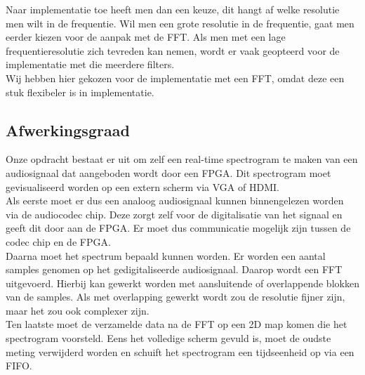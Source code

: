 \documentclass[a4paper,kul]{kulakarticle} %
\begin{document}
Naar implementatie toe heeft men dan een keuze, dit hangt af welke resolutie men wilt in de frequentie. Wil men een grote resolutie in de frequentie, gaat men eerder kiezen voor de aanpak met de FFT. Als men met een lage frequentieresolutie zich tevreden kan nemen, wordt er vaak geopteerd voor de implementatie met die meerdere filters.\\
Wij hebben hier gekozen voor de implementatie met een FFT, omdat deze een stuk flexibeler is in implementatie.


\subsection{Afwerkingsgraad}

Onze opdracht bestaat er uit om zelf een real-time spectrogram te maken van een audiosignaal dat aangeboden wordt door een FPGA. Dit spectrogram moet gevisualiseerd worden op een extern scherm via VGA of HDMI. \\

Als eerste moet er dus een analoog audiosignaal kunnen binnengelezen worden via de audiocodec chip. Deze zorgt zelf voor de digitalisatie van het signaal en geeft dit door aan de FPGA. Er moet dus communicatie mogelijk zijn tussen de codec chip en de FPGA.\\

Daarna moet het spectrum bepaald kunnen worden. Er worden een aantal samples genomen op het gedigitaliseerde audiosignaal. Daarop wordt een FFT uitgevoerd. Hierbij kan gewerkt worden met aansluitende of overlappende blokken van de samples. Als met overlapping gewerkt wordt zou de resolutie fijner zijn, maar het zou ook complexer zijn. \\

Ten laatste moet de verzamelde data na de FFT op een 2D map komen die het spectrogram voorsteld. Eens het volledige scherm gevuld is, moet de oudste meting verwijderd worden en schuift het spectrogram een tijdseenheid op via een FIFO. \\
\end{document}
